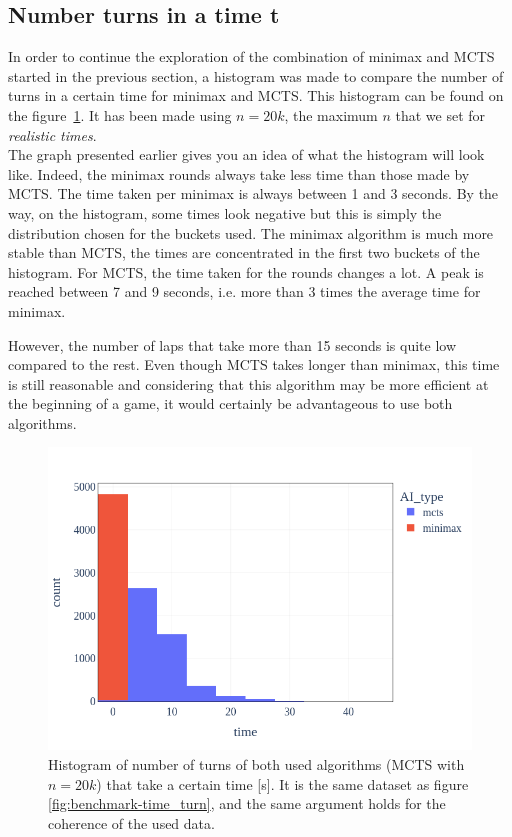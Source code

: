 \subsection{Number turns in a time t}
In order to continue the exploration of the combination of minimax and MCTS started in the previous section, a histogram was made to compare the number of turns in a certain time for minimax and MCTS. This histogram can be found on the figure~\ref{fig:benchmark-time_histo}. It has been made using $n=20k$, the maximum $n$ that we set for \textit{realistic times}.\\

The graph presented earlier gives you an idea of what the histogram will look like. Indeed, the minimax rounds always take less time than those made by MCTS. The time taken per minimax is always between 1 and 3 seconds. By the way, on the histogram, some times look negative but this is simply the distribution chosen for the buckets used. The minimax algorithm is much more stable than MCTS, the times are concentrated in the first two buckets of the histogram. For MCTS, the time taken for the rounds changes a lot. A peak is reached between 7 and 9 seconds, i.e. more than 3 times the average time for minimax.

However, the number of laps that take more than 15 seconds is quite low compared to the rest. Even though MCTS takes longer than minimax,
this time is still reasonable and considering that this algorithm may be more efficient at the beginning of a game, it would certainly be advantageous to use both algorithms.

\begin{figure}[ht]
    \centering
    \includegraphics[width=\linewidth]{plots/Histogram_n20000.png}
    \caption{Histogram of number of turns of both used algorithms (MCTS with $n=20k$) that take a certain time [s]. It is the same dataset as figure \ref{fig:benchmark-time_turn}, and the same argument holds for the coherence of the used data.}
    \label{fig:benchmark-time_histo}
\end{figure}
